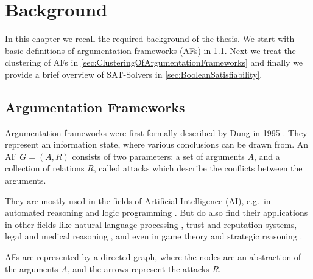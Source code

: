\chapter{Background}
\label{ch:Background}
In this chapter we recall the required background of the thesis. We start with basic definitions of argumentation frameworks (AFs) in \cref{sec:ArgumentationFrameworks}. Next we treat the clustering of AFs in \cref{sec:ClusteringOfArgumentationFrameworks} and finally we provide a brief overview of SAT-Solvers in \cref{sec:BooleanSatisfiability}.

\section{Argumentation Frameworks}
\label{sec:ArgumentationFrameworks}

Argumentation frameworks were first formally described by Dung in 1995 \cite{DUNG1995321}. They represent an information state, where various conclusions can be drawn from. An AF $G = (A, R)$ consists of two parameters: a set of arguments $A$, and a collection of relations $R$, called attacks which describe the conflicts between the arguments.

They are mostly used in the fields of Artificial Intelligence (AI), e.g.\ in automated reasoning and logic programming \cite{AFINAIARLP, AFINAIARLPexample}. But do also find their applications in other fields like natural language processing \cite{AFINNLP}, trust and reputation systems, legal and medical reasoning \cite{legalAndMedicalReasoning}, and even in game theory and strategic reasoning \cite{AFinGames}.

AFs are represented by a directed graph, where the nodes are an abstraction of the arguments $A$, and the arrows represent the attacks $R$. 

